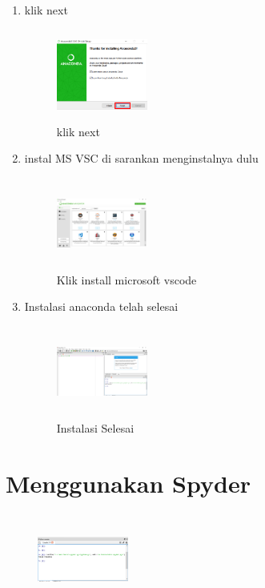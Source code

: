 \begin{enumerate}
    \item klik next
    \begin{figure}[H]
        \centering
        \includegraphics[width=3cm,height=3cm]{figures/8.png}
        \caption{klik next}
        \label{offering}
        \end{figure}

 \item instal MS VSC di sarankan menginstalnya dulu
    \begin{figure}[H]
        \centering
        \includegraphics[width=3cm,height=3cm]{figures/9.png}
        \caption{Klik install microsoft vscode}
        \label{offering}
        \end{figure}

    \item Instalasi anaconda telah selesai
     \begin{figure}[H]
        \centering
        \includegraphics[width=3cm,height=3cm]{figures/10.png}
        \caption{Instalasi Selesai}
        \label{akhir}
        \end{figure}
\end{enumerate}

\section{Menggunakan Spyder}

     \begin{figure}[H]
        \centering
        \includegraphics[width=3cm,height=3cm]{figures/11.PNG}
        \label{akhir}
        \end{figure}

